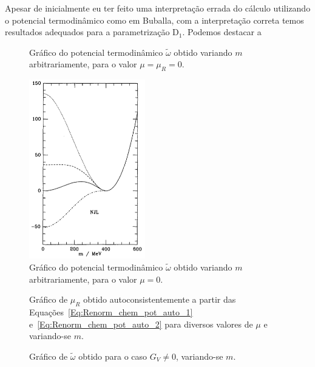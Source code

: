 Apesar de inicialmente eu ter feito uma interpretação errada do cálculo utilizando o potencial termodinâmico como em Buballa\cite{Buballa1996}, com a interpretação correta temos resultados adequados para a parametrização D$_1$. Podemos destacar a 
 

\begin{figure}
	
	\caption{Gráfico do potencial termodinâmico $\tilde{\omega}$ obtido variando $m$ arbitrariamente, para o valor $\mu = \mu_R = 0$. \protect}
	\label{Fig:pot_term_analysys_NJL-Buballa_Set_1}
\end{figure}

\begin{figure}
	\centering
	\includegraphics[width=0.45\textwidth]{graphics/Therm_pot_analysis/Pot_buballa.png}
	\caption{Gráfico do potencial termodinâmico $\tilde{\omega}$ obtido variando $m$ arbitrariamente, para o valor $\mu = 0$.}
	\label{Fig:pot_term_analysys_Buballa_NJL-Buballa_Set_1}
\end{figure}

\begin{figure}
	
	\caption{Gráfico de $\mu_R$ obtido autoconsistentemente a partir das Equações~\eqref{Eq:Renorm_chem_pot_auto_1} e~\eqref{Eq:Renorm_chem_pot_auto_2} para diversos valores de $\mu$ e variando-se $m$. \protect}
	\label{Fig:Renorm_chem_pot}
\end{figure}

\begin{figure}
	
	\caption{Gráfico de $\tilde\omega$ obtido para o caso $G_V \neq 0$, variando-se $m$. \protect}
	\label{Fig:Fig2.8RBubR_repro}
\end{figure}

